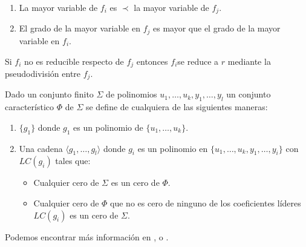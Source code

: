 \begin{enumerate}
	\item La mayor variable de $f_i$ es $\prec$ la mayor variable de $f_j$.
	\item El grado de la mayor variable en $f_j$ es mayor que el grado de la mayor variable en $f_i$.
\end{enumerate} 

Si $f_i$ no es reducible respecto de $f_j$ entonces $f_i$se reduce a $r$ mediante la pseudodivisión entre $f_j$.

\begin{definition}
	Dado un conjunto finito $\Sigma$ de polinomios $u_1, \dotso, u_k, y_1, \dotso, y_l$ un conjunto característico $\Phi$ de $\Sigma$ se define de cualquiera de las siguientes maneras:
	\begin{enumerate}
		\item $\{ g_1 \}$ donde $g_1$ es un polinomio de $\{ u_1, \dotso, u_k \}$.
		\item Una cadena $\langle g_1, \dotso, g_l \rangle$ donde $g_i$ es un polinomio en $\{ u_1, \dotso, u_k, y_1, \dotso, y_i \}$ con $LC(g_i)$ tales que:
		\begin{itemize}
			\item Cualquier cero de $\Sigma$ es un cero de $\Phi$.
			\item Cualquier cero de $\Phi$ que no es cero de ninguno de los coeficientes líderes $LC(g_i)$ es un cero de $\Sigma$.
		\end{itemize}
	\end{enumerate}
\end{definition}

Podemos encontrar más información en \cite{Berchtold00}, \cite{Gallo91_2} o \cite{Gallo91_1}.